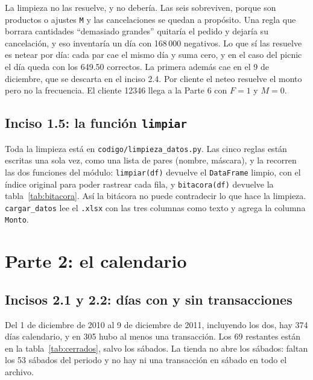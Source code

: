 \documentclass[11pt]{article}
\begin{document}
La limpieza no las resuelve, y no debería. Las seis sobreviven, porque son productos o ajustes
\texttt{M} y las cancelaciones se quedan a propósito. Una regla que borrara cantidades
``demasiado grandes'' quitaría el pedido y dejaría su cancelación, y eso inventaría un día con
\textsterling{}168\,000 negativos. Lo que sí las resuelve es netear por día: cada par cae el mismo día y suma
cero, y en el caso del picnic el día queda con los \textsterling{}649.50 correctos. La primera además cae en el
9 de diciembre, que se descarta en el inciso 2.4. Por cliente el neteo resuelve el monto pero no
la frecuencia. El cliente 12346 llega a la Parte 6 con $F=1$ y $M=0$.

\subsection*{Inciso 1.5: la función \texttt{limpiar}}

Toda la limpieza está en \texttt{codigo/limpieza\_datos.py}. Las cinco reglas están escritas una
sola vez, como una lista de pares (nombre, máscara), y la recorren las dos funciones del módulo:
\texttt{limpiar(df)} devuelve el \texttt{DataFrame} limpio, con el índice original para poder
rastrear cada fila, y \texttt{bitacora(df)} devuelve la tabla~\ref{tab:bitacora}. Así la bitácora
no puede contradecir lo que hace la limpieza. \texttt{cargar\_datos} lee el \texttt{.xlsx} con las
tres columnas como texto y agrega la columna \texttt{Monto}.

\section*{Parte 2: el calendario}

\subsection*{Incisos 2.1 y 2.2: días con y sin transacciones}

Del 1 de diciembre de 2010 al 9 de diciembre de 2011, incluyendo los dos, hay 374 días
calendario, y en 305 hubo al menos una transacción. Los 69 restantes están en la
tabla~\ref{tab:cerrados}, salvo los sábados. La tienda no abre los sábados: faltan los
53 sábados del periodo y no hay ni una transacción en sábado en todo el archivo.
\end{document}
